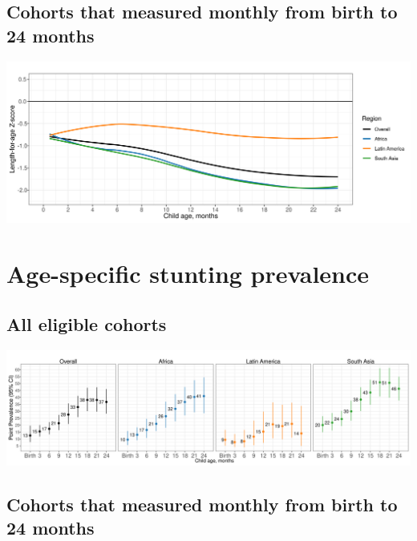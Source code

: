 \documentclass[
  9pt,
]{book}
\begin{document}
\hypertarget{cohorts-that-measured-monthly-from-birth-to-24-months}{%
\subsection{Cohorts that measured monthly from birth to 24 months}\label{cohorts-that-measured-monthly-from-birth-to-24-months}}

\includegraphics[width=41.67in]{figures//stunting/fig-laz-2-mean-overall_region--allage-month24}

\hypertarget{age-specific-stunting-prevalence}{%
\section{Age-specific stunting prevalence}\label{age-specific-stunting-prevalence}}

\hypertarget{all-eligible-cohorts-1}{%
\subsection{All eligible cohorts}\label{all-eligible-cohorts-1}}

\includegraphics[width=58.33in]{figures//stunting/fig-stunt-2-prev-overall_region--allage-primary}

\hypertarget{cohorts-that-measured-monthly-from-birth-to-24-months-1}{%
\subsection{Cohorts that measured monthly from birth to 24 months}\label{cohorts-that-measured-monthly-from-birth-to-24-months-1}}
\end{document}
